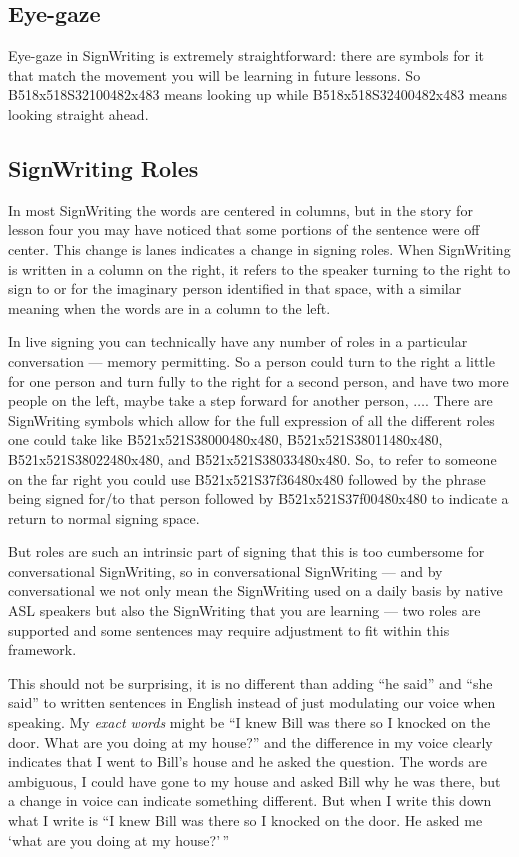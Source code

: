 \documentclass{article}
\begin{document}
\subsection{Eye-gaze}

Eye-gaze in SignWriting is extremely straightforward: there are symbols for it that match the movement you will be learning in future lessons.
So B518x518S32100482x483 means looking up while B518x518S32400482x483 means looking straight ahead.

\subsection{SignWriting Roles}

In most SignWriting the words are centered in columns, but in the story for lesson four you may have noticed that some portions of the sentence were off center.
This change is lanes indicates a change in signing roles.
When SignWriting is written in a column on the right, it refers to the speaker turning to the right to sign to or for the imaginary person identified in that space, with a similar meaning when the words are in a column to the left.

In live signing you can technically have any number of roles in a particular conversation --- memory permitting.
So a person could turn to the right a little for one person and turn fully to the right for a second person, and have two more people on the left, maybe take a step forward for another person, $\ldots$.
There are SignWriting symbols which allow for the full expression of all the different roles one could take like B521x521S38000480x480, B521x521S38011480x480, B521x521S38022480x480, and B521x521S38033480x480.
So, to refer to someone on the far right you could use B521x521S37f36480x480 followed by the phrase being signed for/to that person followed by B521x521S37f00480x480 to indicate a return to normal signing space.

But roles are such an intrinsic part of signing that this is too cumbersome for conversational SignWriting, so in conversational SignWriting ---
and by conversational we not only mean the SignWriting used on a daily basis by native ASL speakers but also the SignWriting that you are learning ---
two roles are supported and some sentences may require adjustment to fit within this framework.

This should not be surprising, it is no different than adding ``he said'' and ``she said'' to written sentences in English instead of just modulating our voice when speaking.
My \emph{exact words} might be ``I knew Bill was there so I knocked on the door. What are you doing at my house?'' and the difference in my voice clearly indicates that I went to Bill's house and he asked the question.
The words are ambiguous, I could have gone to my house and asked Bill why he was there, but a change in voice can indicate something different.
But when I write this down what I write is ``I knew Bill was there so I knocked on the door. He asked me `what are you doing at my house?'\,''
\end{document}
